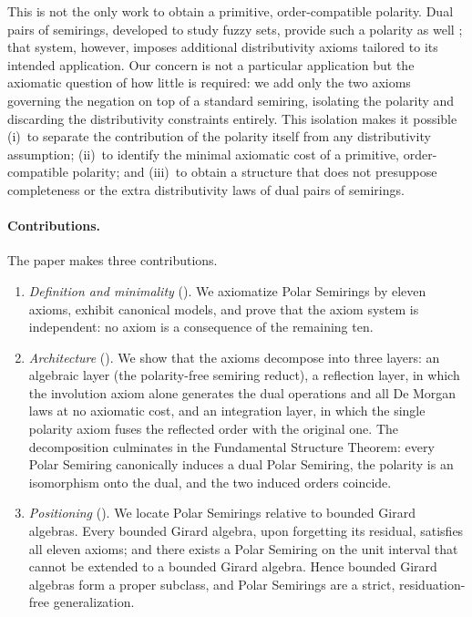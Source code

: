 This is not the only work to obtain a primitive, order-compatible polarity.
Dual pairs of semirings, developed to study fuzzy sets, provide such a polarity
as well \citep{movckovr2025unification}; that system, however, imposes
additional distributivity axioms tailored to its intended application. Our
concern is not a particular application but the axiomatic question of how little
is required: we add only the two axioms governing the negation on top of a
standard semiring, isolating the polarity and discarding the distributivity
constraints entirely. This isolation makes it possible (i)~to separate the
contribution of the polarity itself from any distributivity assumption; (ii)~to
identify the minimal axiomatic cost of a primitive, order-compatible polarity;
and (iii)~to obtain a structure that does not presuppose completeness or the
extra distributivity laws of dual pairs of semirings.

\paragraph{Contributions.}
The paper makes three contributions.
\begin{enumerate}
  \item \emph{Definition and minimality} (). We axiomatize Polar
  Semirings by eleven axioms, exhibit canonical models, and prove that the
  axiom system is independent: no axiom is a consequence of the remaining
  ten.
  \item \emph{Architecture} (). We show that the axioms
  decompose into three layers: an algebraic layer (the polarity-free
  semiring reduct), a reflection layer, in which the involution axiom alone
  generates the dual operations and all De Morgan laws at no axiomatic cost,
  and an integration layer, in which the single polarity axiom fuses the
  reflected order with the original one. The decomposition culminates in the
  Fundamental Structure Theorem: every Polar Semiring canonically induces a
  dual Polar Semiring, the polarity is an isomorphism onto the dual, and the
  two induced orders coincide.
  \item \emph{Positioning} (). We locate Polar
  Semirings relative to bounded Girard algebras. Every bounded Girard
  algebra, upon forgetting its residual, satisfies all eleven axioms; and
  there exists a Polar Semiring on the unit interval that cannot be extended
  to a bounded Girard algebra. Hence bounded Girard algebras form a proper
  subclass, and Polar Semirings are a strict, residuation-free
  generalization.
\end{enumerate}

